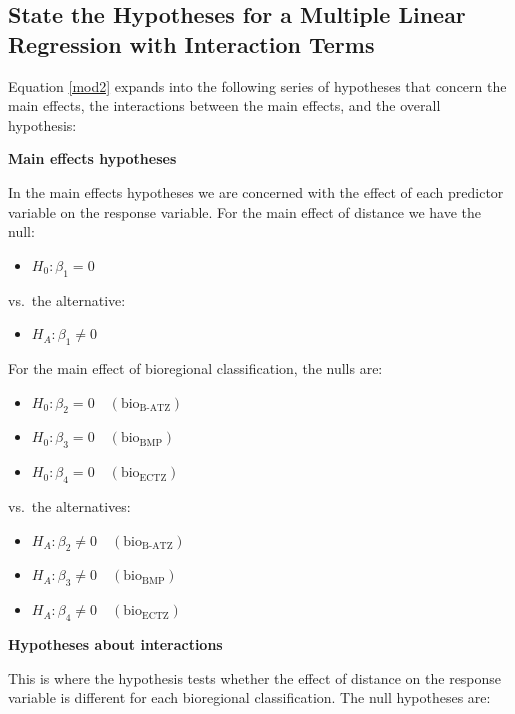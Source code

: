 \documentclass[
  letterpaper,
]{book}
\providecommand{\tightlist}{%
  \setlength{\itemsep}{0pt}\setlength{\parskip}{0pt}}\usepackage{longtable,booktabs,array}
\begin{document}
\subsection{State the Hypotheses for a Multiple Linear Regression with
Interaction
Terms}\label{state-the-hypotheses-for-a-multiple-linear-regression-with-interaction-terms}

Equation \ref{mod2} expands into the following series of hypotheses that
concern the main effects, the interactions between the main effects, and
the overall hypothesis:

\textbf{Main effects hypotheses}

In the main effects hypotheses we are concerned with the effect of each
predictor variable on the response variable. For the main effect of
distance we have the null:

\begin{itemize}
\tightlist
\item
  \(H_0: \beta_1 = 0\)
\end{itemize}

vs.~the alternative:

\begin{itemize}
\tightlist
\item
  \(H_A: \beta_1 \neq 0\)
\end{itemize}

For the main effect of bioregional classification, the nulls are:

\begin{itemize}
\tightlist
\item
  \(H_0: \beta_2 = 0 \quad (\text{bio}_{\text{B-ATZ}})\)
\item
  \(H_0: \beta_3 = 0 \quad (\text{bio}_{\text{BMP}})\)
\item
  \(H_0: \beta_4 = 0 \quad (\text{bio}_{\text{ECTZ}})\)
\end{itemize}

vs.~the alternatives:

\begin{itemize}
\tightlist
\item
  \(H_A: \beta_2 \neq 0 \quad (\text{bio}_{\text{B-ATZ}})\)
\item
  \(H_A: \beta_3 \neq 0 \quad (\text{bio}_{\text{BMP}})\)
\item
  \(H_A: \beta_4 \neq 0 \quad (\text{bio}_{\text{ECTZ}})\)
\end{itemize}

\textbf{Hypotheses about interactions}

This is where the hypothesis tests whether the effect of distance on the
response variable is different for each bioregional classification. The
null hypotheses are:
\end{document}
